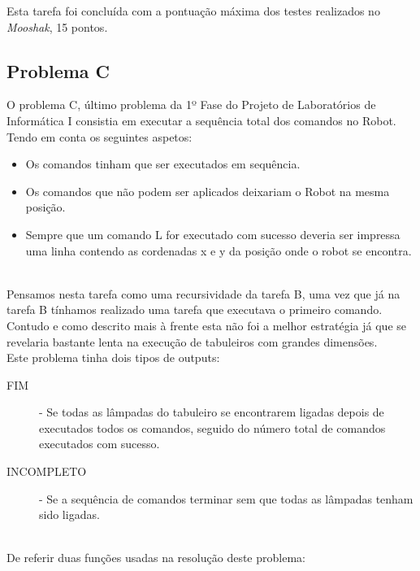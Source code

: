 \documentclass[a4paper,12pt,portuges]{article}
\begin{document}
Esta tarefa foi concluída com a pontuação máxima dos testes realizados no \textit{Mooshak}, 15 pontos.\\

\subsection {Problema C}


O problema C, último problema da 1º Fase do Projeto de Laboratórios de Informática I consistia em executar a sequência total dos comandos no Robot. Tendo em conta os seguintes aspetos:\\

\begin{itemize}
\item Os comandos tinham que ser executados em sequência. \\
\item Os comandos que não podem ser aplicados deixariam o Robot na mesma posição.\\
\item Sempre que um comando L for executado com sucesso deveria ser impressa uma linha contendo as cordenadas x e y da posição onde o robot se encontra.
\end{itemize}
\\

Pensamos nesta tarefa como uma recursividade da tarefa B, uma vez que já na tarefa B tínhamos realizado uma tarefa que executava o primeiro comando. Contudo e como descrito mais à frente esta não foi a melhor estratégia já que se revelaria bastante lenta na execução de tabuleiros com grandes dimensões.\\
Este problema tinha dois tipos de outputs:\\  

\begin{description}
\item[FIM] - Se todas as lâmpadas do tabuleiro se encontrarem ligadas depois de executados todos os comandos, seguido do número total de comandos executados com sucesso.\\
\item [INCOMPLETO] - Se a sequência de comandos terminar sem que todas as lâmpadas tenham sido ligadas.
\end{description}
\\
De referir duas funções usadas na resolução deste problema:\\
\end{document}
